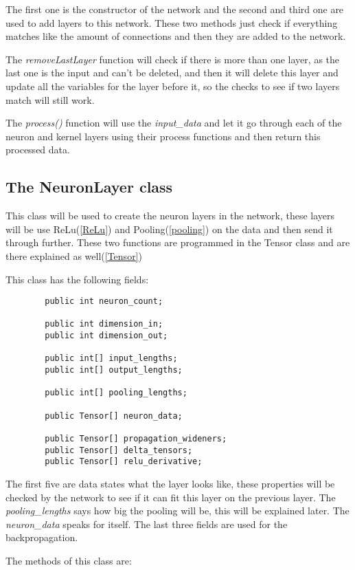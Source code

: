 \documentclass[12pt, titlepage]{article}
\begin{document}
		The first one is the constructor of the network and the second and third one are used to add layers to this network. These two methods just check if everything matches like the amount of connections and then they are added to the network.
		
		The \textit{removeLastLayer} function will check if there is more than one layer, as the last one is the input and can't be deleted, and then it will delete this layer and update all the variables for the layer before it, so the checks to see if two layers match will still work.
		
		The \textit{process()} function will use the \textit{input\_data} and let it go through each of the neuron and kernel layers using their process functions and then return this processed data. 
		
		
		
		\pagebreak
		\subsection{The NeuronLayer class}
		This class will be used to create the neuron layers in the network, these layers will be use ReLu(\ref{ReLu}) and Pooling(\ref{pooling}) on the data and then send it through further. These two functions are programmed in the Tensor class and are there explained as well(\ref{Tensor})
		
		This class has the following fields:
		\begin{lstlisting}
		public int neuron_count;
		
		public int dimension_in;
		public int dimension_out;
		
		public int[] input_lengths;
		public int[] output_lengths;
		
		public int[] pooling_lengths;
		
		public Tensor[] neuron_data;
		
		public Tensor[] propagation_wideners;
		public Tensor[] delta_tensors;
		public Tensor[] relu_derivative;
		\end{lstlisting}
		
		The first five are data states what the layer looks like, these properties will be checked by the network to see if it can fit this layer on the previous layer. The \textit{pooling\_lengths} says how big the pooling will be, this will be explained later. The \textit{neuron\_data} speaks for itself. The last three fields are used for the backpropagation.
		
		The methods of this class are:
		
\end{document}
